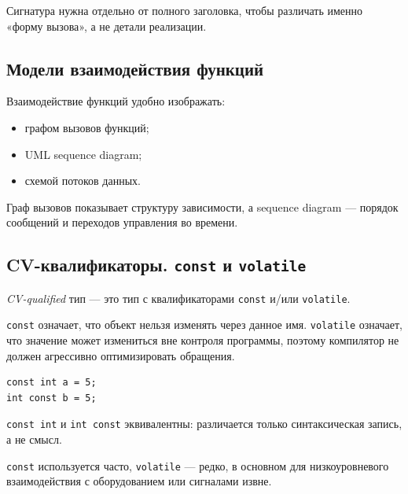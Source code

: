 \begin{remark}
Сигнатура нужна отдельно от полного заголовка, чтобы различать именно «форму вызова», а не детали реализации.
\end{remark}

\subsection{Модели взаимодействия функций}
Взаимодействие функций удобно изображать:
\begin{itemize}
    \item графом вызовов функций;
    \item UML sequence diagram;
    \item схемой потоков данных.
\end{itemize}

\begin{remark}
Граф вызовов показывает структуру зависимости, а sequence diagram — порядок сообщений и переходов управления во времени.
\end{remark}

\subsection{CV-квалификаторы. \texttt{const} и \texttt{volatile}}
\begin{definition}[CV-квалификаторы]
\textit{CV-qualified} тип — это тип с квалификаторами \texttt{const} и/или \texttt{volatile}.
\end{definition}

\texttt{const} означает, что объект нельзя изменять через данное имя.  
\texttt{volatile} означает, что значение может измениться вне контроля программы, поэтому компилятор не должен агрессивно оптимизировать обращения.

\begin{example}
\begin{verbatim}
const int a = 5;
int const b = 5;
\end{verbatim}
\end{example}

\texttt{const int} и \texttt{int const} эквивалентны: различается только синтаксическая запись, а не смысл.

\begin{remark}
\texttt{const} используется часто, \texttt{volatile} — редко, в основном для низкоуровневого взаимодействия с оборудованием или сигналами извне.
\end{remark}

